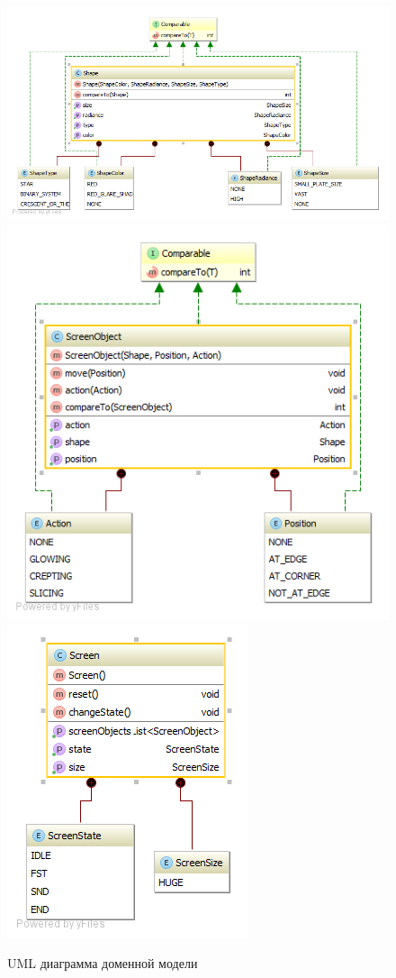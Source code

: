 \documentclass[a4paper,10pt]{article}
\begin{document}
        \begin{figure}[h!]
            \includegraphics[scale=0.6]{./img/Shape.png}
            \includegraphics[scale=0.6]{./img/ScreenObject.png}
            \includegraphics[scale=0.6]{./img/Screen.png}
            \caption{UML диаграмма доменной модели}
        \end{figure}     
\newpage
\end{document}
